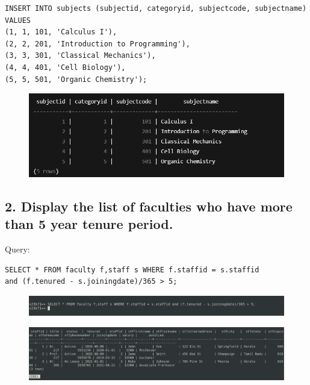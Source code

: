 \documentclass{article}
\begin{document}
\begin{Verbatim}[frame=single,framerule=1pt,fontfamily=courier,fontsize=\small]
INSERT INTO subjects (subjectid, categoryid, subjectcode, subjectname) VALUES 
(1, 1, 101, 'Calculus I'),
(2, 2, 201, 'Introduction to Programming'),
(3, 3, 301, 'Classical Mechanics'),
(4, 4, 401, 'Cell Biology'),
(5, 5, 501, 'Organic Chemistry');
\end{Verbatim}
\begin{figure}[H]
    \centering
    \includegraphics[width=\textwidth]{select/subjects.png}
\end{figure}

\subsection*{2. Display the list of faculties who have more than 5 year tenure period.}
Query:
\begin{Verbatim}[frame=single,framerule=1pt,fontfamily=courier,fontsize=\small]
SELECT * FROM faculty f,staff s WHERE f.staffid = s.staffid 
and (f.tenured - s.joiningdate)/365 > 5;
\end{Verbatim}
\begin{figure}[H]
    \centering
    \includegraphics[width=\textwidth]{cycle2/2.2.1.png}
\end{figure}
\begin{figure}[H]
    \centering
    \includegraphics[width=\textwidth]{cycle2/2.2.2.png}
\end{figure}
\end{document}
